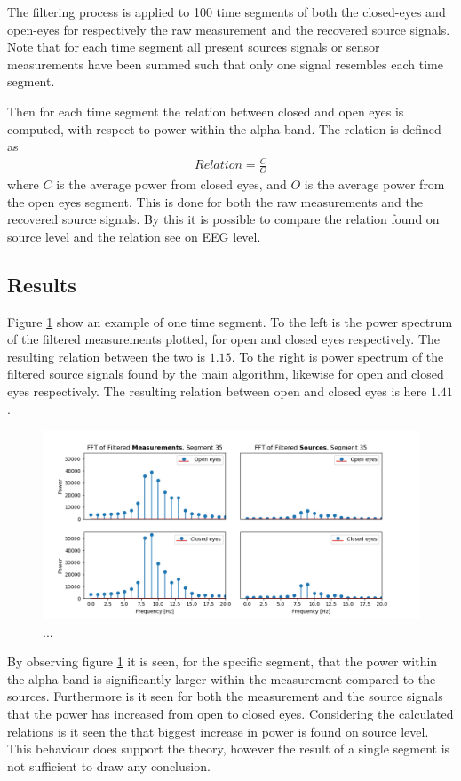 The filtering process is applied to 100 time segments of both the closed-eyes and open-eyes for respectively the raw measurement and the recovered source signals. 
Note that for each time segment all present sources signals or sensor measurements have been summed such that only one signal resembles each time segment.

Then for each time segment the relation between closed and open eyes is computed, with respect to power within the alpha band. The relation is defined as 
\begin{align*}
Relation = \frac{C}{O} 
\end{align*}
where $C$ is the average power from closed eyes, and $O$ is the average power from the open eyes segment. 
This is done for both the raw measurements and the recovered source signals. By this it is possible to compare the relation found on source level and the relation see on EEG level.  

\subsection{Results}
Figure \ref{fig:dft_2} show an example of one time segment. To the left is the power spectrum of the filtered measurements plotted, for open and closed eyes respectively. The resulting relation between the two is $1.15$. To the right is power spectrum of the filtered source signals found by the main algorithm, likewise for open and closed eyes respectively. The resulting relation between open and closed eyes is here $1.41$.  
\begin{figure}[H]
\centering
\includegraphics[scale=0.5]{figures/ch_7/FFT_plot.png}
\caption{...}
\label{fig:dft_2}
\end{figure}
\noindent
By observing figure \ref{fig:dft_2} it is seen, for the specific segment, that the power within the alpha band is significantly larger within the measurement compared to the sources. Furthermore is it seen for both the measurement and the source signals that the power has increased from open to closed eyes. Considering the calculated relations is it seen the that biggest increase in power is found on source level. 
This behaviour does support the theory, however the result of a single segment is not sufficient to draw any conclusion.          

